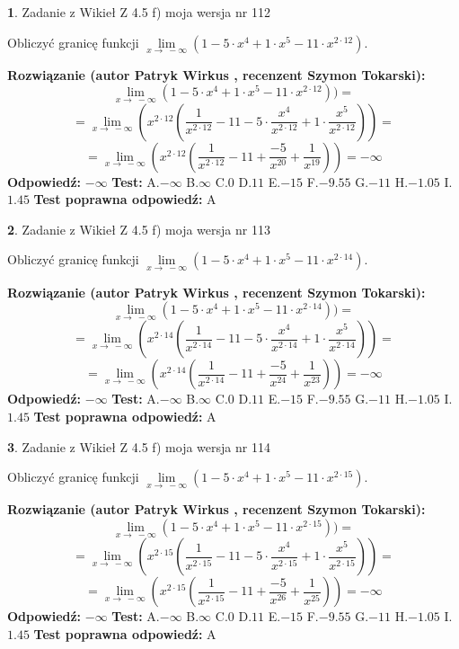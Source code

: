 \documentclass[12pt, a4paper]{article}
\theoremstyle{definition} %
\newtheorem{zad}{}
\newcommand{\zadStart}[1]{\begin{zad}#1\newline}
\newcommand{\zadStop}{\end{zad}}
\newcommand{\rozwStart}[2]{\noindent \textbf{Rozwiązanie (autor #1 , recenzent #2): }\newline}
\newcommand{\rozwStop}{\newline}
\newcommand{\odpStart}{\noindent \textbf{Odpowiedź:}\newline}
\newcommand{\odpStop}{\newline}
\newcommand{\testStart}{\noindent \textbf{Test:}\newline}
\newcommand{\testStop}{\newline}
\newcommand{\kluczStart}{\noindent \textbf{Test poprawna odpowiedź:}\newline}
\newcommand{\kluczStop}{\newline}
\begin{document}
\zadStart{Zadanie z Wikieł Z 4.5 f) moja wersja nr 112}


Obliczyć granicę funkcji  $\lim\limits_{x\to\ -\infty}(1 - 5 \cdot x^{4}+1 \cdot x^{5}- 11 \cdot x^{2\cdot12})$.
\zadStop
\rozwStart{Patryk Wirkus}{Szymon Tokarski}
$$\lim\limits_{x\to\ -\infty}(1 - 5 \cdot x^{4}+1 \cdot x^{5}- 11 \cdot x^{2\cdot12}))=$$
$$=\lim\limits_{x\to\ -\infty}(x^{2\cdot12}(\frac{1}{x^{2\cdot12}}-11 -5 \cdot \frac{x^{4}}{x^{2\cdot12}}+1 \cdot \frac{x^{5}}{x^{2\cdot12}}))=$$
$$=\lim\limits_{x\to\ -\infty}(x^{2\cdot12}(\frac{1}{x^{2\cdot12}}-11 + \frac{-5}{x^{20}}+ \frac{1}{x^{19}}))=-\infty$$
\rozwStop
\odpStart
$-\infty$
\odpStop
\testStart
A.$-\infty$ B.$\infty$ C.$0$ D.$11$ E.$-15$
F.$-9.55$ G.$-11$
H.$-1.05$
I.$1.45$
\testStop
\kluczStart
A
\kluczStop



\zadStart{Zadanie z Wikieł Z 4.5 f) moja wersja nr 113}


Obliczyć granicę funkcji  $\lim\limits_{x\to\ -\infty}(1 - 5 \cdot x^{4}+1 \cdot x^{5}- 11 \cdot x^{2\cdot14})$.
\zadStop
\rozwStart{Patryk Wirkus}{Szymon Tokarski}
$$\lim\limits_{x\to\ -\infty}(1 - 5 \cdot x^{4}+1 \cdot x^{5}- 11 \cdot x^{2\cdot14}))=$$
$$=\lim\limits_{x\to\ -\infty}(x^{2\cdot14}(\frac{1}{x^{2\cdot14}}-11 -5 \cdot \frac{x^{4}}{x^{2\cdot14}}+1 \cdot \frac{x^{5}}{x^{2\cdot14}}))=$$
$$=\lim\limits_{x\to\ -\infty}(x^{2\cdot14}(\frac{1}{x^{2\cdot14}}-11 + \frac{-5}{x^{24}}+ \frac{1}{x^{23}}))=-\infty$$
\rozwStop
\odpStart
$-\infty$
\odpStop
\testStart
A.$-\infty$ B.$\infty$ C.$0$ D.$11$ E.$-15$
F.$-9.55$ G.$-11$
H.$-1.05$
I.$1.45$
\testStop
\kluczStart
A
\kluczStop



\zadStart{Zadanie z Wikieł Z 4.5 f) moja wersja nr 114}


Obliczyć granicę funkcji  $\lim\limits_{x\to\ -\infty}(1 - 5 \cdot x^{4}+1 \cdot x^{5}- 11 \cdot x^{2\cdot15})$.
\zadStop
\rozwStart{Patryk Wirkus}{Szymon Tokarski}
$$\lim\limits_{x\to\ -\infty}(1 - 5 \cdot x^{4}+1 \cdot x^{5}- 11 \cdot x^{2\cdot15}))=$$
$$=\lim\limits_{x\to\ -\infty}(x^{2\cdot15}(\frac{1}{x^{2\cdot15}}-11 -5 \cdot \frac{x^{4}}{x^{2\cdot15}}+1 \cdot \frac{x^{5}}{x^{2\cdot15}}))=$$
$$=\lim\limits_{x\to\ -\infty}(x^{2\cdot15}(\frac{1}{x^{2\cdot15}}-11 + \frac{-5}{x^{26}}+ \frac{1}{x^{25}}))=-\infty$$
\rozwStop
\odpStart
$-\infty$
\odpStop
\testStart
A.$-\infty$ B.$\infty$ C.$0$ D.$11$ E.$-15$
F.$-9.55$ G.$-11$
H.$-1.05$
I.$1.45$
\testStop
\kluczStart
A
\kluczStop
\end{document}
